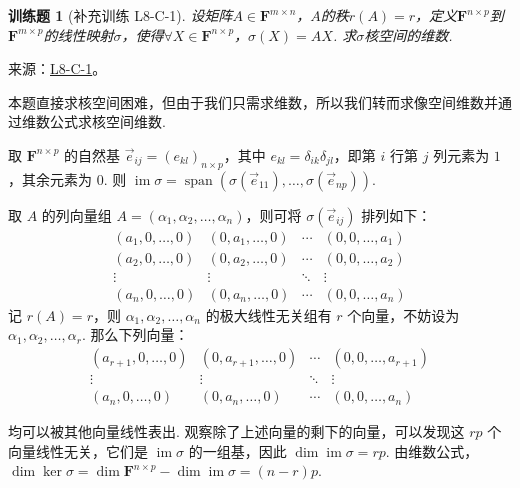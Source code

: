 \documentclass[12pt,fontset=fandol]{ctexart}
\newtheorem{exercise}{训练题}[section]
\begin{document}
\begin{exercise}[补充训练 L8-C-1]\label{prob:L8-C-1}
设矩阵$A \in \mathbf{F}^{m \times n}$，$A$的秩$r(A)=r$，定义$\mathbf{F}^{n \times p}$到$\mathbf{F}^{m \times p}$的线性映射$\sigma$，使得$\forall X \in \mathbf{F}^{n \times p}$，$\sigma(X)=AX$. 求$\sigma$核空间的维数.
\end{exercise}
\noindent 来源：\href{https://github.com/yhwu-is/Linear-Algebra-Left-Undone/blob/new/%E8%AE%B2%E4%B9%89/%E4%B8%93%E9%A2%98/8%20%E7%9B%B8%E6%8A%B5%E6%A0%87%E5%87%86%E5%BD%A2.tex}{L8-C-1}。
\begin{solve}
本题直接求核空间困难，但由于我们只需求维数，所以我们转而求像空间维数并通过维数公式求核空间维数.

          取 $ \mathbf{F}^{n \times p} $ 的自然基 $ \vec{e}_{ij} = (e_{kl})_{n \times p} $，其中 $ e_{kl} = \delta_{ik} \delta_{jl} $，即第 $ i $ 行第 $ j $ 列元素为 $ 1 $，其余元素为 $ 0 $. 则 $ \operatorname{im} \sigma = \operatorname{span}(\sigma(\vec{e}_{11}), \ldots, \sigma(\vec{e}_{np})) $.

          取 $ A $ 的列向量组 $ A = (\alpha_1, \alpha_2, \ldots, \alpha_n) $，则可将 $ \sigma(\vec{e}_{ij}) $ 排列如下：
          \[ \begin{matrix}
                  (a_1, 0, \ldots, 0) & (0, a_1, \ldots, 0) & \cdots & (0, 0, \ldots, a_1) \\
                  (a_2, 0, \ldots, 0) & (0, a_2, \ldots, 0) & \cdots & (0, 0, \ldots, a_2) \\
                  \vdots              & \vdots              & \ddots & \vdots              \\
                  (a_n, 0, \ldots, 0) & (0, a_n, \ldots, 0) & \cdots & (0, 0, \ldots, a_n)
              \end{matrix} \]
          记 $ r(A) = r $，则 $ \alpha_1, \alpha_2, \ldots, \alpha_n $ 的极大线性无关组有 $ r $ 个向量，不妨设为 $ \alpha_1, \alpha_2, \ldots, \alpha_r $. 那么下列向量：
          \[ \begin{matrix}
                  (a_{r+1}, 0, \ldots, 0) & (0, a_{r+1}, \ldots, 0) & \cdots & (0, 0, \ldots, a_{r+1}) \\
                  \vdots                  & \vdots                  & \ddots & \vdots                  \\
                  (a_n, 0, \ldots, 0)     & (0, a_n, \ldots, 0)     & \cdots & (0, 0, \ldots, a_n)
              \end{matrix} \]

          均可以被其他向量线性表出. 观察除了上述向量的剩下的向量，可以发现这 $ rp $ 个向量线性无关，它们是 $ \operatorname{im} \sigma $ 的一组基，因此 $ \dim \operatorname{im} \sigma = rp $. 由维数公式，$ \dim \ker \sigma = \dim \mathbf{F}^{n \times p} - \dim \operatorname{im} \sigma = (n - r)p $.
\end{solve}
\end{document}
